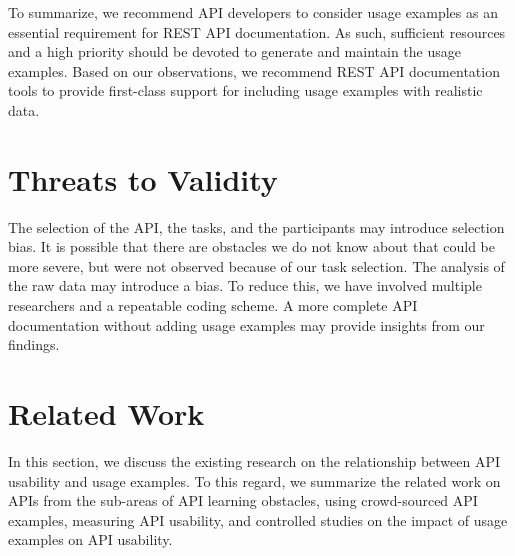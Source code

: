\documentclass[conference]{IEEEtran}
\begin{document}
\vspace{1mm}
\hspace{-5mm}
\vspace{0.5mm}

To summarize, we recommend API developers to consider usage examples as an essential requirement for REST API documentation. As such, sufficient resources and a high priority should be devoted to generate and maintain the usage examples. Based on our observations, we recommend REST API documentation tools to provide first-class support for including usage examples with realistic data.

\section{Threats to Validity}
\label{sec:threat}
The selection of the API, the tasks, and the participants may introduce selection bias. It is possible that there are obstacles we do not know about that could be more severe, but were not observed because of our task selection. The analysis of the raw data may introduce a bias. To reduce this, we have involved multiple researchers and a repeatable coding scheme. A more complete API documentation without adding usage examples may provide  insights from our findings.

\section{Related Work}
\label{sec:related_work}

In this section, we discuss the existing research on the relationship between API usability and usage examples. To this regard, we summarize the related work on APIs from the sub-areas of API learning obstacles, using crowd-sourced API examples, measuring API usability, and controlled studies on the impact of usage examples on API usability.
\end{document}

